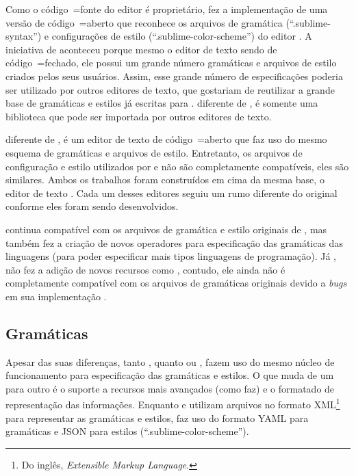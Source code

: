 Como o código~=fonte do editor  é proprietário,
 fez a implementação de uma versão de código~=aberto que reconhece os arquivos de gramática (``.sublime-syntax'') e
configurações de estilo (``.sublime-color-scheme'') do editor .
A iniciativa de  aconteceu porque mesmo o editor de texto  sendo de código~=fechado,
ele possui um grande número gramáticas e
arquivos de estilo criados pelos seus usuários.
Assim,
esse grande número de especificações poderia ser utilizado por outros editores de texto,
que gostariam de reutilizar a grande base de gramáticas e
estilos já escritas para .
 diferente de ,
é somente uma biblioteca que pode ser importada por outros editores de texto.

 diferente de ,
é um editor de texto de código~=aberto que faz uso do mesmo esquema de gramáticas e
arquivos de estilo.
Entretanto,
os arquivos de configuração e
estilo utilizados por  e
 não são completamente compatíveis,
eles são similares.
Ambos os trabalhos foram construídos em cima da mesma base,
o editor de texto .
Cada um desses editores seguiu um rumo diferente do original  conforme eles foram sendo desenvolvidos.

 continua compatível com os arquivos de gramática e
estilo originais de ,
mas também fez a criação de novos operadores para especificação das gramáticas das linguagens (para poder especificar mais tipos linguagens de programação).
Já ,
não fez a adição de novos recursos como ,
contudo,
ele ainda não é completamente compatível com os arquivos de gramáticas originais devido a \textit{bugs} em sua implementação \cite{textMateScopeExclusion}.


\subsection{Gramáticas}
\label{section:sourceCodeHighlightersGrammars}

Apesar das suas diferenças,
tanto , quanto  ou ,
fazem uso do mesmo núcleo de funcionamento para especificação das gramáticas e
estilos.
O que muda de um para outro é o suporte a recursos mais avançados (como  faz) e
o formatado de representação das informações.
Enquanto  e
 utilizam arquivos no formato XML\footnote{
Do inglês,
\textit{Extensible Markup Language}.
} \cite{complexityOfXMLSchema} para representar as gramáticas e
estilos,
 faz uso do formato YAML \cite{yamlSpecificModelChecking} para gramáticas e
JSON para estilos (``.sublime-color-scheme'').

